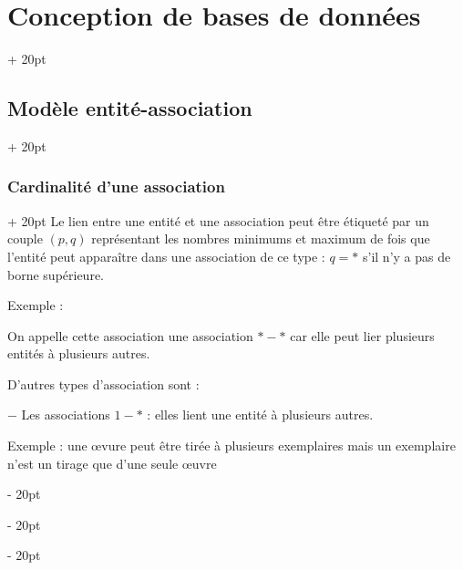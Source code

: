 \documentclass[a4paper, 12pt, twoside]{article}
\newcommand{\ind}[1][20pt]{\advance\leftskip + #1}
\newcommand{\deind}[1][20pt]{\advance\leftskip - #1}
\newenvironment{indt}[2][20pt]{#2 \par \ind[#1]}{\par \deind} %
\begin{document}
\begin{indt}{\section{Conception de bases de données}}
\begin{indt}{\subsection{Modèle entité-association}}
            \vspace{12pt}
            
            \begin{indt}{\subsubsection{Cardinalité d'une association}}
                Le lien entre une entité et une association peut être étiqueté par un couple $(p, q)$ représentant les nombres minimums et maximum de fois que l'entité peut apparaître dans une association de ce type : $q = *$  s'il n'y a pas de borne supérieure.

                Exemple :

                \begin{center}
                \end{center}

                On appelle cette association une association $*-*$ car elle peut lier plusieurs entités à plusieurs autres.

                D'autres types d'association sont :

                $-$ Les associations $1-*$ : elles lient une entité à plusieurs autres.

                Exemple : une \oe vure peut être tirée à plusieurs exemplaires mais un exemplaire n'est un tirage que d'une seule \oe uvre

                \begin{center}
                \end{center}


\end{indt}
\end{indt}
\end{indt}
\end{document}
